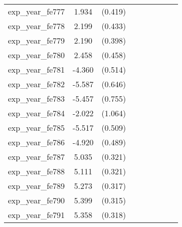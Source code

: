 {\begin{tabular}{l*{4}{cc}}
exp\_year\_fe777&    1.934\sym{***}&  (0.419)&                  &         &                  &         &                  &         \\
exp\_year\_fe778&    2.199\sym{***}&  (0.433)&                  &         &                  &         &                  &         \\
exp\_year\_fe779&    2.190\sym{***}&  (0.398)&                  &         &                  &         &                  &         \\
exp\_year\_fe780&    2.458\sym{***}&  (0.458)&                  &         &                  &         &                  &         \\
exp\_year\_fe781&   -4.360\sym{***}&  (0.514)&                  &         &                  &         &                  &         \\
exp\_year\_fe782&   -5.587\sym{***}&  (0.646)&                  &         &                  &         &                  &         \\
exp\_year\_fe783&   -5.457\sym{***}&  (0.755)&                  &         &                  &         &                  &         \\
exp\_year\_fe784&   -2.022         &  (1.064)&                  &         &                  &         &                  &         \\
exp\_year\_fe785&   -5.517\sym{***}&  (0.509)&                  &         &                  &         &                  &         \\
exp\_year\_fe786&   -4.920\sym{***}&  (0.489)&                  &         &                  &         &                  &         \\
exp\_year\_fe787&    5.035\sym{***}&  (0.321)&                  &         &                  &         &                  &         \\
exp\_year\_fe788&    5.111\sym{***}&  (0.321)&                  &         &                  &         &                  &         \\
exp\_year\_fe789&    5.273\sym{***}&  (0.317)&                  &         &                  &         &                  &         \\
exp\_year\_fe790&    5.399\sym{***}&  (0.315)&                  &         &                  &         &                  &         \\
exp\_year\_fe791&    5.358\sym{***}&  (0.318)&                  &         &                  &         &                  &         \\

\end{tabular}}
